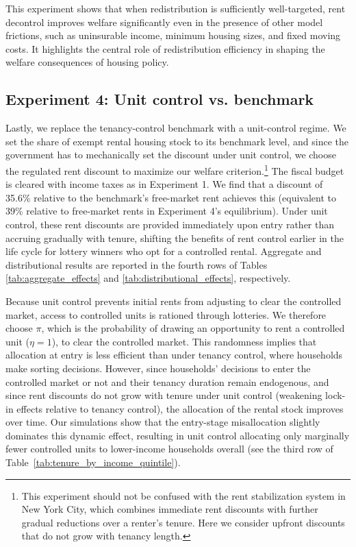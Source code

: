 \documentclass[parskip=full]{article}
\begin{document}
This experiment shows that when redistribution is sufficiently well-targeted, rent decontrol improves welfare significantly even in the presence of other model frictions, such as uninsurable income, minimum housing sizes, and fixed moving costs. It highlights the central role of redistribution efficiency in shaping the welfare consequences of housing policy.

\subsection{Experiment 4: Unit control vs. benchmark}\label{sec:exp_4}

Lastly, we replace the tenancy-control benchmark with a unit-control regime. We set the share of exempt rental housing stock to its benchmark level, and since the government has to mechanically set the discount under unit control, we choose the regulated rent discount to maximize our welfare criterion.\footnote{This experiment should not be confused with the rent stabilization system in New York City, which combines immediate rent discounts with further gradual reductions over a renter's tenure. Here we consider upfront discounts that do not grow with tenancy length.} The fiscal budget is cleared with income taxes as in Experiment 1. We find that a discount of 35.6\% relative to the benchmark's free-market rent achieves this (equivalent to 39\% relative to free-market rents in Experiment 4's equilibrium). Under unit control, these rent discounts are provided immediately upon entry rather than accruing gradually with tenure, shifting the benefits of rent control earlier in the life cycle for lottery winners who opt for a controlled rental. Aggregate and distributional results are reported in the fourth rows of Tables \ref{tab:aggregate_effects} and \ref{tab:distributional_effects}, respectively.

Because unit control prevents initial rents from adjusting to clear the controlled market, access to controlled units is rationed through lotteries. We therefore choose $\pi$, which is the probability of drawing an opportunity to rent a controlled unit ($\eta=1$), to clear the controlled market. This randomness implies that allocation at entry is less efficient than under tenancy control, where households make sorting decisions. However, since households' decisions to enter the controlled market or not and their tenancy duration remain endogenous, and since rent discounts do not grow with tenure under unit control (weakening lock-in effects relative to tenancy control), the allocation of the rental stock improves over time. Our simulations show that the entry-stage misallocation slightly dominates this dynamic effect, resulting in unit control allocating only marginally fewer controlled units to lower-income households overall (see the third row of Table~\ref{tab:tenure_by_income_quintile}).
\end{document}
